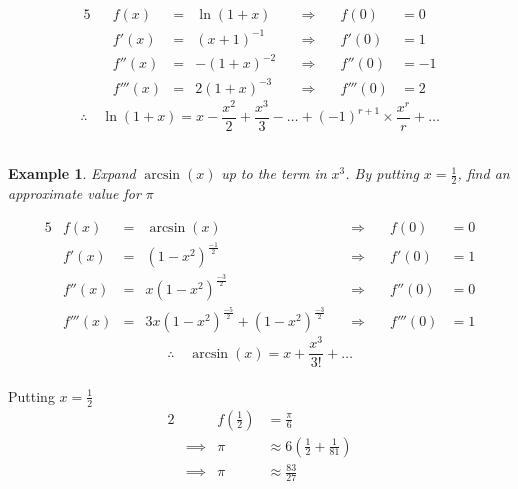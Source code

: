 \documentclass[12pt, a4paper]{report}
\theoremstyle{definition}
\newtheorem{example}{Example}
\begin{document}
	\begin{alignat*}{5}
		&   & f(x)    & = & \ln(1+x)      \quad & \Rightarrow  \quad & f(0)    & = 0  \\
		&   & f'(x)   & = & (x+1)^{-1} \quad    & \Rightarrow  \quad & f'(0)   & = 1  \\
		&   & f''(x)  & = & -(1+x)^{-2}  \quad  & \Rightarrow \quad  & f''(0)  & = -1 \\
		&   & f'''(x) & = & 2(1+x)^{-3} \quad   & \Rightarrow  \quad & f'''(0) & = 2  
	\end{alignat*}
	$$\therefore \quad \ln(1+x)  = x - \frac{x^2}{2} + \frac{x^3}{3} - \ldots + (-1)^{r+1}\times\frac{x^r}{r} + \ldots $$\\
	\hrulefill
	
	\begin{example}
		\emph{Expand} $\arcsin(x)$ \emph{up to the term in $x^3$. By putting $x=\frac{1}{2}$, find an approximate value for $\pi$}
	\end{example}
	
	\begin{alignat*}{5}
		& f(x)    & = & \arcsin(x)      \quad                                   & \Rightarrow  \quad & f(0)    & = 0 \\
		& f'(x)   & = & (1-x^2)^{\frac{-1}{2}} \quad                            & \Rightarrow  \quad & f'(0)   & = 1 \\
		& f''(x)  & = & x(1-x^2)^{\frac{-3}{2}}\quad                            & \Rightarrow \quad  & f''(0)  & = 0 \\
		& f'''(x) & = & 3x(1-x^2)^{\frac{-5}{2}} + (1-x^2)^{\frac{-3}{2}} \quad & \Rightarrow  \quad & f'''(0) & = 1 
	\end{alignat*}
	$$\therefore \quad \arcsin(x)   = x + \frac{x^3}{3!} + \ldots $$\\
	Putting $x = \frac{1}{2}$\\
	\begin{alignat*}{2}
		&          & f\left(\frac{1}{2}\right) & = \frac{\pi}{6}                                \\
		& \implies & \pi                       & \approx 6\left(\frac{1}{2}+\frac{1}{81}\right) \\
		& \implies & \pi                       & \approx \frac{83}{27}                          
	\end{alignat*}
	\newpage
\end{document}
